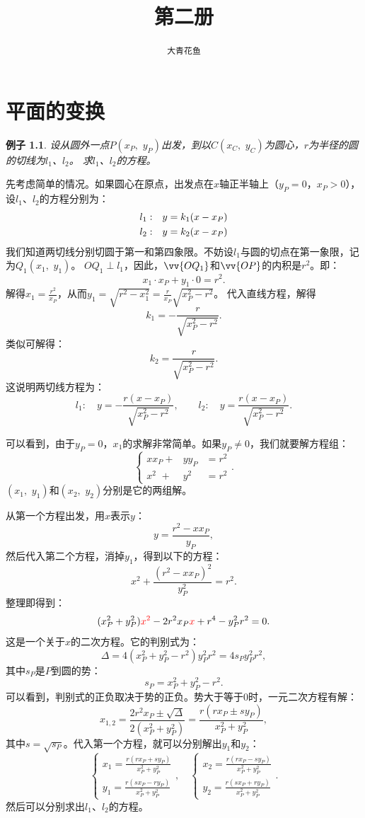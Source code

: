 \documentclass[12pt,UTF8]{ctexbook}
\title{\zihao{0} \bfseries 第二册}
\author{\zihao{2} \texttt{大青花鱼}}
\date{}
\newtheorem{ex}{例子}[section]
\begin{document}
\maketitle
\tableofcontents
\newpage

\chapter{平面的变换}
\begin{ex}\label{ex:0-0-0}
    设从圆外一点$P(x_P, \,\,y_P)$出发，到以$C(x_C,\,\,y_C)$为圆心，$r$为半径的圆的切线为$l_1$、$l_2$。
    求$l_1$、$l_2$的方程。
\end{ex}

先考虑简单的情况。如果圆心在原点，出发点在$x$轴正半轴上（$y_P = 0$，$x_P>0$），设$l_1$、$l_2$的方程分别为：
\begin{align}
    l_1:\quad & y = k_1(x - x_P) \notag \\
    l_2:\quad & y = k_2(x - x_P) \notag 
\end{align}
我们知道两切线分别切圆于第一和第四象限。不妨设$l_1$与圆的切点在第一象限，记为$Q_1(x_1,\,\,y_1)$。
$OQ_1\perp l_1$，因此，$\vv{OQ_1}$和$\vv{OP}$的内积是$r^2$。即：
$$ x_1\cdot x_P + y_1\cdot 0 = r^2.$$
解得$x_1 = \frac{r^2}{x_P}$，从而$y_1 = \sqrt{r^2 - x_1^2} = \frac{r}{x_P}\sqrt{x_P^2 - r^2}$。
代入直线方程，解得
$$k_1 = -\frac{r}{\sqrt{x_P^2 - r^2}}.$$
类似可解得：
$$k_2 = \frac{r}{\sqrt{x_P^2 - r^2}}.$$
这说明两切线方程为：
$$l_1: \quad y = -\frac{r(x - x_P)}{\sqrt{x_P^2 - r^2}}, \qquad l_2:\quad y = \frac{r(x - x_P)}{\sqrt{x_P^2 - r^2}}.$$

可以看到，由于$y_P = 0$，$x_1$的求解非常简单。如果$y_P \neq 0$，我们就要解方程组：
$$ 
  \left\{ \begin{array}{rrc}
    x x_P +& y y_P &= r^2 \\
    x^2\,\, +& y^2 &= r^2
  \end{array}\right. .
$$
$(x_1, \,\,y_1)$和$(x_2,\,\,y_2)$分别是它的两组解。

从第一个方程出发，用$x$表示$y$：
$$ y = \frac{r^2 - xx_P}{y_P},$$
然后代入第二个方程，消掉$y_1$，得到以下的方程：
$$ x^2 + \frac{(r^2 - xx_P)^2}{y_P^2} = r^2.$$
整理即得到：
$$ (x_P^2+y_P^2){\color{red}x^2} - 2r^2x_P{\color{red}x} + r^4 - y_P^2r^2 = 0.$$
这是一个关于$x$的二次方程。它的判别式为：
$$\Delta = 4(x_P^2+y_P^2 - r^2)y_P^2r^2 = 4s_Py_P^2r^2,$$
其中$s_P$是$P$到圆的势：
$$ s_P = x_P^2+y_P^2 - r^2. $$
可以看到，判别式的正负取决于势的正负。势大于等于$0$时，一元二次方程有解：
$$x_{1,2} = \frac{2r^2x_P \pm \sqrt{\Delta} }{2(x_P^2+y_P^2)} =  \frac{r(rx_P \pm sy_P) }{x_P^2+y_P^2}, $$
其中$s = \sqrt{s_P}$。代入第一个方程，就可以分别解出$y_1$和$y_2$：
$$
    \left\{ \begin{array}{rrc}
        x_1 = \frac{r(rx_P + sy_P) }{x_P^2+y_P^2} \\
        y_1 = \frac{r(sx_P - ry_P)}{x_P^2+y_P^2}
    \end{array}\right., 
    \quad
    \left\{ \begin{array}{rrc}
        x_2 = \frac{r(rx_P - sy_P) }{x_P^2+y_P^2} \\
        y_2 = \frac{r(sx_P + ry_P)}{x_P^2+y_P^2}
    \end{array}\right..
$$
然后可以分别求出$l_1$、$l_2$的方程。
\end{document}
